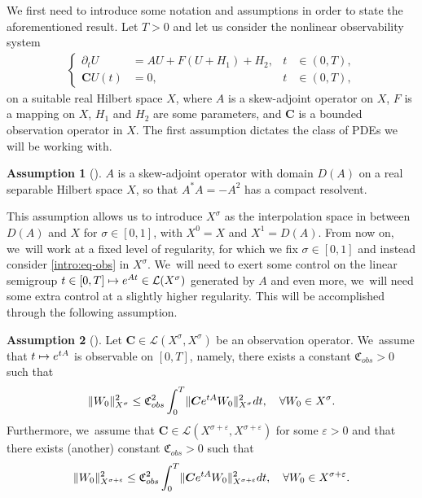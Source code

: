 \documentclass[11pt]{article}
\newcommand\mto{\mathchoice{\longmapsto}{\mapsto}{\mapsto}{\mapsto}}
\theoremstyle{definition}
\newtheorem{assum}{Assumption}
\newenvironment{assump}[2][]
{\renewcommand\theassum{#2}\begin{assum}[#1]}
{\end{assum}}
\let\mc\mathcal
\let\veps\varepsilon
\newcommand{\bC}{\boldsymbol{C}}
\providecommand{\norm}[1]{\lVert#1\rVert}
\begin{document}
We first need to introduce some notation and assumptions in order to state the aforementioned result. Let $T>0$ and let us consider the nonlinear observability system
\begin{align}\label{intro:eq-obs}
\left\{\begin{aligned}
\partial_t U&=AU+F(U+H_1)+H_2, &t&\in (0, T), \\
\bC U(t)&=0, &t&\in (0, T),
\end{aligned}\right.
\end{align}
on a suitable real Hilbert space $X$, where $A$ is a skew-adjoint operator on $X$, $F$ is a mapping on $X$, $H_1$ and $H_2$ are some parameters, and $\bC$ is a bounded observation operator in $X$. The first assumption dictates the class of PDEs we will be working with.
\begin{assump}{1}
\label{assumAA}$A$ is a skew-adjoint operator with domain $D(A)$ on a real separable Hilbert space $X$, so that $A^*A=-A^2$ has a compact resolvent.
\end{assump}
This assumption allows us to introduce $X^\sigma$ as the interpolation space in between $D(A)$ and $X$ for $\sigma\in [0, 1]$, with $X^0=X$ and $X^1=D(A)$. From now on, we~will work at a fixed level of regularity, for which we fix $\sigma\in [0, 1]$ and instead consider \eqref{intro:eq-obs} in $X^\sigma$. We~will need to exert some control on the linear semigroup $t\in [0, T]\mto e^{At}\in \mc{L}(X^\sigma)$ generated by $A$ and even more, we~will need some extra control at a slightly higher regularity. This will be accomplished through the following assumption.

\begin{assump}{2}
\label{assumCC}Let $\bC\in\mc{L}(X^\sigma, X^\sigma)$ be an observation operator. We~assume that $t\mto e^{tA}$ is observable on $[0,T]$, namely, there exists a constant $\mathfrak{C}_{obs}>0$ such that
\begin{align}\label{observabstractintro}
\norm{W_0}_{X^\sigma}^2\leq \mathfrak{C}_{\textup{obs}}^2\int_0^T \norm{\bC e^{tA}W_0}_{X^\sigma}^2dt,\quad \forall W_0\in X^\sigma.
\end{align}
Furthermore, we~assume that $\bC\in\mc{L}(X^{\sigma+\veps}, X^{\sigma+\veps})$ for some $\veps>0$ and that there exists (another) constant $\mathfrak{C}_{obs}>0$ such that
\begin{align}\label{observabstractvepsintro}
\norm{W_0}_{X^{\sigma+\veps}}^2\leq \mathfrak{C}_{\textup{obs}}^2\int_0^T \norm{\bC e^{tA}W_0}_{X^{\sigma+\veps}}^2dt,\quad \forall W_0\in X^{\sigma+\veps}.
\end{align}
\end{assump}
\end{document}
